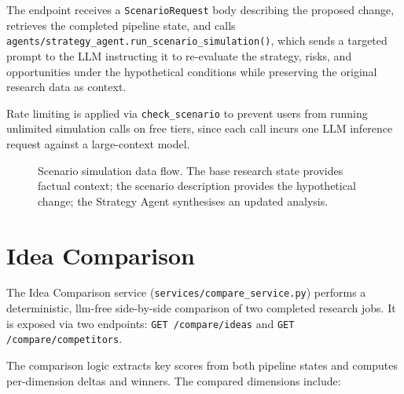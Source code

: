 \documentclass[12pt,a4paper,oneside]{book}
\begin{document}
The endpoint receives a \texttt{ScenarioRequest} body describing the proposed change,
retrieves the completed pipeline state, and calls
\texttt{agents/strategy\_agent.run\_scenario\_simulation()}, which sends a targeted
prompt to the LLM instructing it to re-evaluate the strategy, risks, and opportunities
under the hypothetical conditions while preserving the original research data as context.

Rate limiting is applied via \texttt{check\_scenario} to prevent users from running
unlimited simulation calls on free tiers, since each call incurs one LLM inference
request against a large-context model.

\begin{figure}[H]
\centering
{}
\caption{Scenario simulation data flow. The base research state provides factual
context; the scenario description provides the hypothetical change; the Strategy Agent
synthesises an updated analysis.}
\label{fig:scenario_flow}
\end{figure}

\section{Idea Comparison}
\label{sec:idea_comparison}

The Idea Comparison service (\texttt{services/compare\_service.py}) performs a
deterministic, \gls{llm}-free side-by-side comparison of two completed research
jobs. It is exposed via two endpoints:
\texttt{GET /compare/ideas} and \texttt{GET /compare/competitors}.

The comparison logic extracts key scores from both pipeline states and computes
per-dimension deltas and winners. The compared dimensions include:
\end{document}
